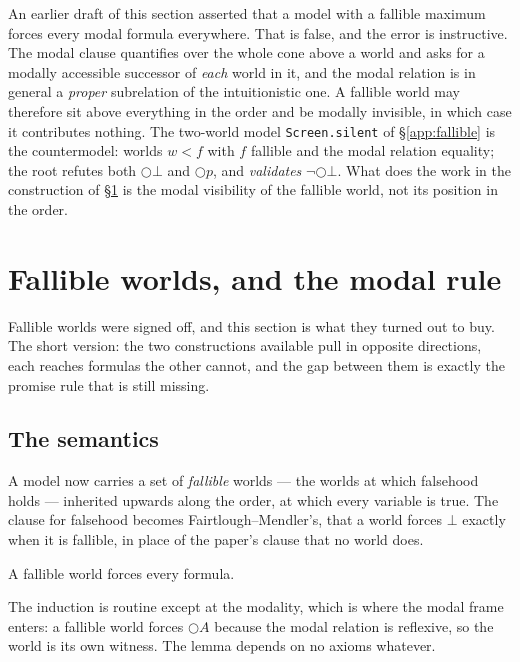 \documentclass[11pt,a4paper]{article}
\begin{document}
\begin{remark}[a correction]\label{rem:correction}
An earlier draft of this section asserted that a model with a fallible
maximum forces every modal formula everywhere. That is false, and the
error is instructive. The modal clause quantifies over the whole cone
above a world and asks for a modally accessible successor of \emph{each}
world in it, and the modal relation is in general a \emph{proper}
subrelation of the intuitionistic one. A fallible world may therefore sit
above everything in the order and be modally invisible, in which case it
contributes nothing. The two-world model \texttt{Screen.silent} of
\S\ref{app:fallible} is the countermodel: worlds $w < f$ with $f$ fallible
and the modal relation equality; the root refutes both $\bigcirc\bot$ and
$\bigcirc p$, and \emph{validates} $\neg\bigcirc\bot$. What does the work
in the construction of \S\ref{sec:w3} is the modal visibility of the
fallible world, not its position in the order.
\end{remark}

\section{Fallible worlds, and the modal rule}
\label{sec:w3}

Fallible worlds were signed off, and this section is what they turned out
to buy. The short version: the two constructions available pull in
opposite directions, each reaches formulas the other cannot, and the gap
between them is exactly the promise rule that is still missing.

\subsection{The semantics}

A model now carries a set of \emph{fallible} worlds --- the worlds at
which falsehood holds --- inherited upwards along the order, at which
every variable is true. The clause for falsehood becomes
Fairtlough--Mendler's, that a world forces $\bot$ exactly when it is
fallible, in place of the paper's clause that no world does.

\begin{lemma}\label{lem:falforce}
A fallible world forces every formula.
\end{lemma}

\noindent
The induction is routine except at the modality, which is where the modal
frame enters: a fallible world forces $\bigcirc A$ because the modal
relation is reflexive, so the world is its own witness. The lemma depends
on no axioms whatever.
\end{document}
